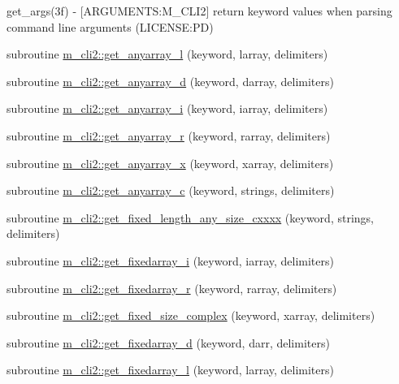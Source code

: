 \begin{DoxyCompactItemize}
\begin{DoxyCompactList}
get\+\_\+args(3f) -\/ \mbox{[}A\+R\+G\+U\+M\+E\+N\+TS\+:M\+\_\+\+C\+L\+I2\mbox{]} return keyword values when parsing command line arguments (L\+I\+C\+E\+N\+SE\+:PD) \end{DoxyCompactList}\item 
subroutine \mbox{\hyperlink{namespacem__cli2_a47cc758d20b655bc21672c31289e54ce}{m\+\_\+cli2\+::get\+\_\+anyarray\+\_\+l}} (keyword, larray, delimiters)
\item 
subroutine \mbox{\hyperlink{namespacem__cli2_aaede1f28172778cf45f4b6c04967bbbd}{m\+\_\+cli2\+::get\+\_\+anyarray\+\_\+d}} (keyword, darray, delimiters)
\item 
subroutine \mbox{\hyperlink{namespacem__cli2_ad314315dd5c93abff5168265f5ff0e4e}{m\+\_\+cli2\+::get\+\_\+anyarray\+\_\+i}} (keyword, iarray, delimiters)
\item 
subroutine \mbox{\hyperlink{namespacem__cli2_a8f1d5223b075f23d513c94548a1ebf09}{m\+\_\+cli2\+::get\+\_\+anyarray\+\_\+r}} (keyword, rarray, delimiters)
\item 
subroutine \mbox{\hyperlink{namespacem__cli2_ab9ab288fa5f108beeb7c94d81b223b7c}{m\+\_\+cli2\+::get\+\_\+anyarray\+\_\+x}} (keyword, xarray, delimiters)
\item 
subroutine \mbox{\hyperlink{namespacem__cli2_a448e8e24406f4bdbc14f26a940cbbc2c}{m\+\_\+cli2\+::get\+\_\+anyarray\+\_\+c}} (keyword, strings, delimiters)
\item 
subroutine \mbox{\hyperlink{namespacem__cli2_abc31389c45dcd95b8db641b59b98b447}{m\+\_\+cli2\+::get\+\_\+fixed\+\_\+length\+\_\+any\+\_\+size\+\_\+cxxxx}} (keyword, strings, delimiters)
\item 
subroutine \mbox{\hyperlink{namespacem__cli2_aa469ba94e6bb122c9bf30dd8642b693b}{m\+\_\+cli2\+::get\+\_\+fixedarray\+\_\+i}} (keyword, iarray, delimiters)
\item 
subroutine \mbox{\hyperlink{namespacem__cli2_afbec790abad0dca990c0a61cd2d9e9ae}{m\+\_\+cli2\+::get\+\_\+fixedarray\+\_\+r}} (keyword, rarray, delimiters)
\item 
subroutine \mbox{\hyperlink{namespacem__cli2_a32b78784e20e29bf40f17e16d08336fa}{m\+\_\+cli2\+::get\+\_\+fixed\+\_\+size\+\_\+complex}} (keyword, xarray, delimiters)
\item 
subroutine \mbox{\hyperlink{namespacem__cli2_a2c8db0f383888cb2b3ce8643de3fae93}{m\+\_\+cli2\+::get\+\_\+fixedarray\+\_\+d}} (keyword, darr, delimiters)
\item 
subroutine \mbox{\hyperlink{namespacem__cli2_a65ffe8c7a444db5db3be3f6edecef008}{m\+\_\+cli2\+::get\+\_\+fixedarray\+\_\+l}} (keyword, larray, delimiters)

\end{DoxyCompactItemize}
